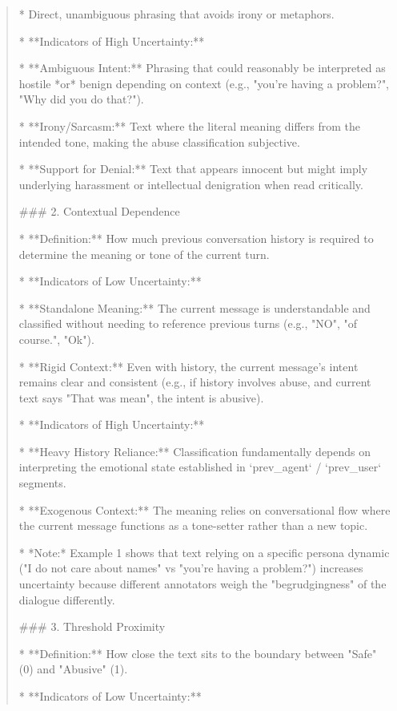\begin{quote}
    *   Direct, unambiguous phrasing that avoids irony or metaphors.

*   **Indicators of High Uncertainty:**

    *   **Ambiguous Intent:** Phrasing that could reasonably be interpreted as hostile *or* benign depending on context (e.g., "you're having a problem?", "Why did you do that?").

    *   **Irony/Sarcasm:** Text where the literal meaning differs from the intended tone, making the abuse classification subjective.

    *   **Support for Denial:** Text that appears innocent but might imply underlying harassment or intellectual denigration when read critically.



### 2. Contextual Dependence

*   **Definition:** How much previous conversation history is required to determine the meaning or tone of the current turn.

*   **Indicators of Low Uncertainty:**

    *   **Standalone Meaning:** The current message is understandable and classified without needing to reference previous turns (e.g., "NO", "of course.", "Ok").

    *   **Rigid Context:** Even with history, the current message's intent remains clear and consistent (e.g., if history involves abuse, and current text says "That was mean", the intent is abusive).

*   **Indicators of High Uncertainty:**

    *   **Heavy History Reliance:** Classification fundamentally depends on interpreting the emotional state established in `prev\_agent` / `prev\_user` segments.

    *   **Exogenous Context:** The meaning relies on conversational flow where the current message functions as a tone-setter rather than a new topic.

    *   *Note:* Example 1 shows that text relying on a specific persona dynamic ("I do not care about names" vs "you're having a problem?") increases uncertainty because different annotators weigh the "begrudgingness" of the dialogue differently.



### 3. Threshold Proximity

*   **Definition:** How close the text sits to the boundary between "Safe" (0) and "Abusive" (1).

*   **Indicators of Low Uncertainty:**


\end{quote}
